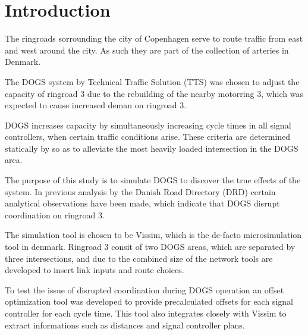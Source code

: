 \section{Introduction}

The ringroads sorrounding the city of Copenhagen serve to route traffic from east and west around the city. As such they are part of the collection of arteries in Denmark.

The DOGS system by Technical Traffic Solution (TTS) was chosen to adjust the capacity of ringroad 3 due to the rebuilding of the nearby motorring 3, which was expected to cause increased deman on ringroad 3.

DOGS increases capacity by simultaneously increasing cycle times in all signal controllers, when certain traffic conditions arise. These criteria are determined statically by so as to alleviate the most heavily loaded intersection in the DOGS area.

The purpose of this study is to simulate DOGS to discover the true effects of the system. In previous analysis by the Danish Road Directory (DRD) certain analytical observations have been made, which indicate that DOGS disrupt coordination on ringroad 3.

The simulation tool is chosen to be Vissim, which is the de-facto microsimulation tool in denmark. Ringroad 3 consit of two DOGS areas, which are separated by three intersections, and due to the combined size of the network tools are developed to insert link inputs and route choices.

To test the issue of disrupted coordination during DOGS operation an offset optimization tool was developed to provide precalculated offsets for each signal controller for each cycle time. This tool also integrates closely with Vissim to extract informations such as distances and signal controller plans. 